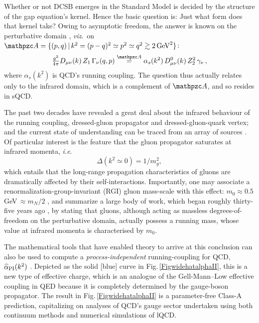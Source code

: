Whether or not DCSB emerges in the Standard Model is decided by the structure of the gap equation's kernel.  Hence the basic question is: Just what form does that kernel take?  Owing to asymptotic freedom, the answer is known on the perturbative domain \cite{Jain:1993qh, Maris:1997tm, Maris:1999nt, Qin:2011dd, Qin:2011xq, Bloch:2002eq}, \emph{viz}.\  on ${\mathpzc A} = \{(p,q)\,|\, k^2=(p-q)^2 \simeq p^2 \simeq q^2 \gtrsim 2\,{\rm GeV}^2\}$:
\begin{equation}
\tfrac{g^2}{4\pi} D_{\mu\nu}(k) \, Z_1 \, \Gamma_\nu(q,p)
 \stackrel{{\mathpzc A}}{=} \alpha_s(k^2)\,
D^{0}_{\mu\nu}(k) \, Z_2^2 \,\gamma_\nu\,,
\label{UVmodelindependent}
\end{equation}
where $\alpha_s(k^2)$ is QCD's running coupling.   The question thus actually relates only to the infrared domain,  which is a complement of ${\mathpzc A}$, and so resides in sQCD.

The past two decades have revealed a great deal about the infrared behaviour of the running coupling, dressed-gluon propagator and dressed-gluon-quark vertex; and the current state of understanding can be traced from an array of sources \cite{Boucaud:2011ug, Binosi:2014aea, Aguilar:2015bud, Binosi:2016wcx, Binosi:2016nmeRMP}.  Of particular interest is the feature that the gluon propagator saturates at infrared momenta, \emph{i.e}.\
\begin{equation}
\Delta(k^2\simeq 0) = 1/m_g^2,
\end{equation}
which entails that the long-range propagation characteristics of gluons are dramatically affected by their self-interactions. Importantly, one may associate a renormalization-group-invariant (RGI) gluon mass-scale with this effect: $m_0 \approx 0.5\,$GeV\,$\approx m_N/2$ \cite{Binosi:2014aea, Binosi:2016nmeRMP, Cyrol:2016tym}, and summarize a large body of work, which began roughly thirty-five years ago \cite{Cornwall:1981zr}, by stating that gluons, although acting as massless degrees-of-freedom on the perturbative domain, actually possess a running mass, whose value at infrared momenta is characterised by $m_0$.

The mathematical tools that have enabled theory to arrive at this conclusion \cite{Abbott:1980hw, Abbott:1981ke, Cornwall:1981zr, Cornwall:1989gv, Pilaftsis:1996fh, Binosi:2002ft, Binosi:2003rr, Binosi:2009qm} can also be used to compute a \emph{process-independent} running-coupling for QCD, $\widehat{\alpha}_{\rm PI}(k^2)$  \cite{Binosi:2016nmeRMP}.  Depicted as the solid [blue] curve in Fig.\,\ref{FigwidehatalphaII}, this is a new type of effective charge, which is an analogue of the Gell-Mann--Low effective coupling in QED \cite{GellMann:1954fq} because it is completely determined by the gauge-boson propagator.  The result in Fig.\,\ref{FigwidehatalphaII} is a parameter-free Class-A prediction, capitalizing on analyses of QCD's gauge sector undertaken using both continuum methods and numerical simulations of lQCD.

